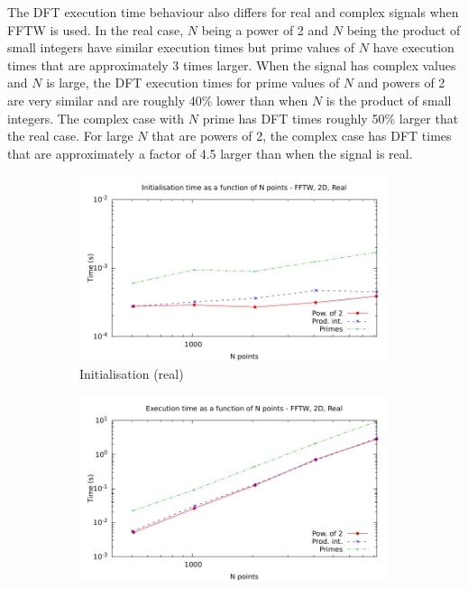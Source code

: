\documentclass[12pt, a4paper]{article} \setlength{\textheight}{24cm}
\begin{document}
The DFT execution time behaviour also differs for real and complex
signals when FFTW is used. In the real case, $N$ being a power of 2
and $N$ being the product of small integers have similar execution
times but prime values of $N$ have execution times that are
approximately 3 times larger. When the signal has complex values and
$N$ is large, the DFT execution times for prime values of $N$ and
powers of 2 are very similar and are roughly 40\% lower than when $N$
is the product of small integers. The complex case with $N$ prime has
DFT times roughly 50\% larger that the real case. For large $N$ that
are powers of 2, the complex case has DFT times that are approximately
a factor of 4.5 larger than when the signal is real.

\begin{figure}[H]
  \centering
  \begin{subfigure}{.5\textwidth}
    \centering
    \includegraphics[width=.9\linewidth]{graphs/2d-fftw-init-r.pdf}
    \caption{Initialisation (real)}
    \label{2DFFTWRI}
  \end{subfigure}%
  \begin{subfigure}{.5\textwidth}
    \centering
    \includegraphics[width=.9\linewidth]{graphs/2d-fftw-exec-r.pdf}

\end{subfigure}
\end{figure}
\end{document}

